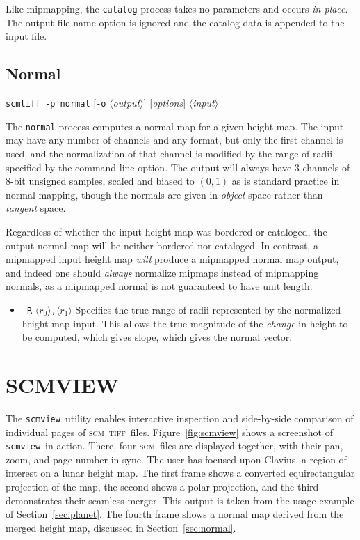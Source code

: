 \documentclass[oneside,10pt]{memoir}
\newcommand{\scm}     {\textsc{scm}}
\newcommand{\tiff}    {\textsc{tiff}}
\newcommand{\scmtiff} {\texttt{scmtiff}}
\newcommand{\scmview} {\texttt{scmview}}
\newcommand{\inangles}[1]{$\langle$#1$\rangle$}
\newenvironment{optionlist}
  {\setlength{\leftmargini}{1in}\begin{itemize}}{\end{itemize}}
\begin{document}
\begin{Spacing}{1.1}
Like mipmapping, the \texttt{catalog} process takes no parameters and occurs \emph{in place}. The output file name option is ignored and the catalog data is appended to the input file.

\subsection{Normal}

\noindent\scmtiff\ \texttt{-p normal} [\texttt{-o} \inangles{\textit{output}}] [\textit{options}] \inangles{\textit{input}}

\bigskip The \texttt{normal} process computes a normal map for a given height map. The input may have any number of channels and any format, but only the first channel is used, and the normalization of that channel is modified by the range of radii specified by the command line option. The output will always have 3 channels of 8-bit unsigned samples, scaled and biased to $(0,1)$ as is standard practice in normal mapping, though the normals are given in \emph{object} space rather than \emph{tangent} space.

Regardless of whether the input height map was bordered or cataloged, the output normal map will be neither bordered nor cataloged. In contrast, a mipmapped input height map \emph{will} produce a mipmapped normal map output, and indeed one should \emph{always} normalize mipmaps instead of mipmapping normals, as a mipmapped normal is not guaranteed to have unit length.

\begin{optionlist}
\item[\texttt{-R} \inangles{$r_0$}\texttt{,}\inangles{$r_1$}] Specifies the true range of radii represented by the normalized height map input. This allows the true magnitude of the \emph{change} in height to be computed, which gives slope, which gives the normal vector.
\end{optionlist}

\section{SCMVIEW}

The \scmview\ utility enables interactive inspection and side-by-side comparison of individual pages of \scm\ \tiff\ files. Figure~\ref{fig:scmview} shows a screenshot of \scmview\ in action. There, four \scm\ files are displayed together, with their pan, zoom, and page number in sync. The user has focused upon Clavius, a region of interest on a lunar height map. The first frame shows a converted equirectangular projection of the map, the second shows a polar projection, and the third demonstrates their seamless merger. This output is taken from the usage example of Section~\ref{sec:planet}. The fourth frame shows a normal map derived from the merged height map, discussed in Section~\ref{sec:normal}.


\end{Spacing}
\end{document}
